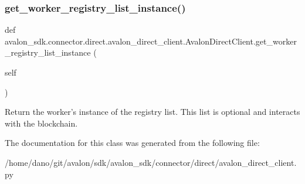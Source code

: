\subsubsection{\texorpdfstring{get\+\_\+worker\+\_\+registry\+\_\+list\+\_\+instance()}{get\_worker\_registry\_list\_instance()}}
{\footnotesize\ttfamily def avalon\+\_\+sdk.\+connector.\+direct.\+avalon\+\_\+direct\+\_\+client.\+Avalon\+Direct\+Client.\+get\+\_\+worker\+\_\+registry\+\_\+list\+\_\+instance (\begin{DoxyParamCaption}\item[{}]{self }\end{DoxyParamCaption})}

\begin{DoxyVerb}Return the worker's instance of the registry list.
This list is optional and interacts with the blockchain.
\end{DoxyVerb}
 

The documentation for this class was generated from the following file\+:\begin{DoxyCompactItemize}
\item 
/home/dano/git/avalon/sdk/avalon\+\_\+sdk/connector/direct/avalon\+\_\+direct\+\_\+client.\+py\end{DoxyCompactItemize}
